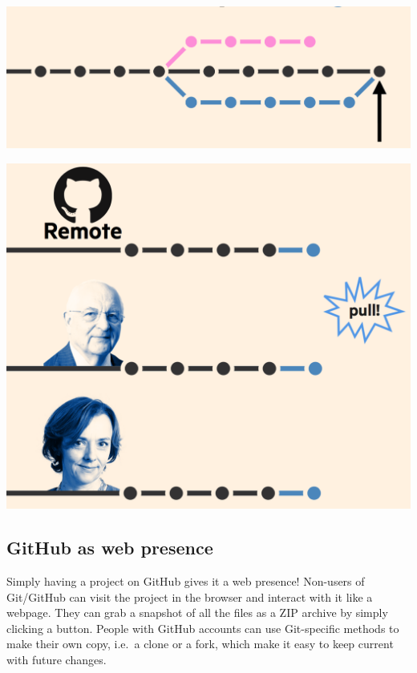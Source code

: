 \documentclass[12pt]{article}
\begin{document}
\includegraphics[width=1\linewidth]{bartlett-merge-commit}

\includegraphics[width=1\linewidth]{bartlett-pull}

\subsection{GitHub as web presence}\label{github-as-web-presence}

Simply having a project on GitHub gives it a web presence! Non-users of
Git/GitHub can visit the project in the browser and interact with it
like a webpage. They can grab a snapshot of all the files as a ZIP
archive by simply clicking a button. People with GitHub accounts can use
Git-specific methods to make their own copy, i.e.~a clone or a fork,
which make it easy to keep current with future changes.
\end{document}
